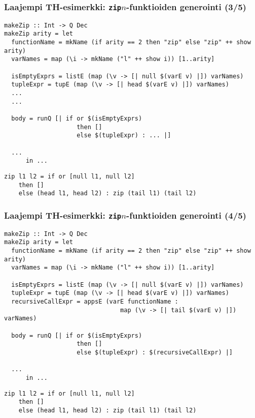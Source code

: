 \documentclass{beamer}
\begin{document}
\begin{frame}[fragile]
\frametitle{Laajempi TH-esimerkki: \texttt{zip$n$}-funktioiden generointi (3/5)}
\footnotesize
\begin{verbatim}
makeZip :: Int -> Q Dec
makeZip arity = let
  functionName = mkName (if arity == 2 then "zip" else "zip" ++ show arity)
  varNames = map (\i -> mkName ("l" ++ show i)) [1..arity]

  isEmptyExprs = listE (map (\v -> [| null $(varE v) |]) varNames)
  tupleExpr = tupE (map (\v -> [| head $(varE v) |]) varNames)
  ...
  ...

  body = runQ [| if or $(isEmptyExprs)
                    then []
                    else $(tupleExpr) : ... |]

  ...
      in ...
\end{verbatim}

\noindent\makebox[\linewidth]{\rule{\paperwidth}{0.4pt}}
\begin{verbatim}
zip l1 l2 = if or [null l1, null l2]
    then []
    else (head l1, head l2) : zip (tail l1) (tail l2)
\end{verbatim}
\end{frame}

\begin{frame}[fragile]
\frametitle{Laajempi TH-esimerkki: \texttt{zip$n$}-funktioiden generointi (4/5)}
\footnotesize
\begin{verbatim}
makeZip :: Int -> Q Dec
makeZip arity = let
  functionName = mkName (if arity == 2 then "zip" else "zip" ++ show arity)
  varNames = map (\i -> mkName ("l" ++ show i)) [1..arity]

  isEmptyExprs = listE (map (\v -> [| null $(varE v) |]) varNames)
  tupleExpr = tupE (map (\v -> [| head $(varE v) |]) varNames)
  recursiveCallExpr = appsE (varE functionName :
                                map (\v -> [| tail $(varE v) |]) varNames)

  body = runQ [| if or $(isEmptyExprs)
                    then []
                    else $(tupleExpr) : $(recursiveCallExpr) |]

  ...
      in ...
\end{verbatim}

\noindent\makebox[\linewidth]{\rule{\paperwidth}{0.4pt}}
\begin{verbatim}
zip l1 l2 = if or [null l1, null l2]
    then []
    else (head l1, head l2) : zip (tail l1) (tail l2)
\end{verbatim}

\end{frame}
\end{document}
